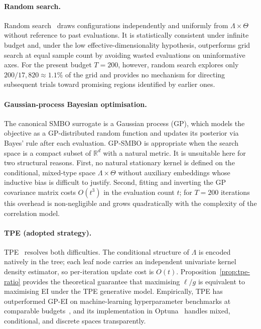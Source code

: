\documentclass[onluarkali,ingilizce,yukseklisans,karton,LisansustuEgitim]{itutez}
\providecommand{\R}{\mathbb{R}}
\providecommand{\1}{\mathbf{1}}
\begin{document}
\paragraph{Random search.}
Random search~\parencite{bergstra2012random} draws configurations independently and uniformly
from $\Lambda\times\Theta$ without reference to past evaluations. It is
statistically consistent under infinite budget and, under the low effective-dimensionality
hypothesis, outperforms grid search at equal sample count by avoiding wasted evaluations
on uninformative axes. For the present budget $T=200$, however, random search explores
only $200/17{,}820\approx 1.1\%$ of the grid and provides no mechanism for directing
subsequent trials toward promising regions identified by earlier ones.

\paragraph{Gaussian-process Bayesian optimisation.}
The canonical SMBO surrogate is a Gaussian process (GP), which models the objective as a
GP-distributed random function and updates its posterior via Bayes' rule after each
evaluation. GP-SMBO is appropriate when the search space is a compact subset of $\R^d$
with a natural metric. It is unsuitable here for two structural reasons. First, no natural
stationary kernel is defined on the conditional, mixed-type space $\Lambda\times\Theta$
without auxiliary embeddings whose inductive bias is difficult to justify. Second, fitting
and inverting the GP covariance matrix costs $O(t^3)$ in the evaluation count $t$; for
$T=200$ iterations this overhead is non-negligible and grows quadratically with the
complexity of the correlation model.

\paragraph{TPE (adopted strategy).}
TPE~\parencite{bergstra2011algorithms} resolves both difficulties. The conditional structure of
$\Lambda$ is encoded natively in the tree; each leaf node carries an independent
univariate kernel density estimator, so per-iteration update cost is $O(t)$.
Proposition~\ref{prop:tpe-ratio} provides the theoretical guarantee that maximising
$\ell/g$ is equivalent to maximising EI under the TPE generative model. Empirically,
TPE has outperformed GP-EI on machine-learning hyperparameter benchmarks at comparable
budgets~\parencite{bergstra2011algorithms,bergstra2012random}, and its implementation in
Optuna~\parencite{optuna} handles mixed, conditional, and discrete spaces transparently.
\end{document}
